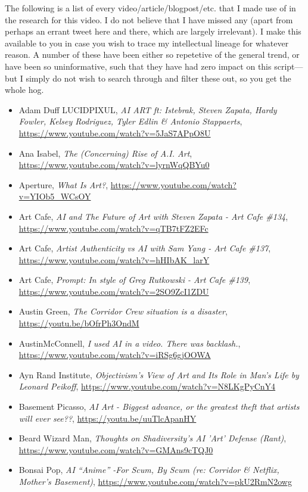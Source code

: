 \documentclass[11pt]{article}
\begin{document}
The following is a list of every video/article/blogpost/etc. that I made use of in the research for this video. I do not believe that I have missed any (apart from perhaps an errant tweet here and there, which are largely irrelevant). I make this available to you in case you wish to trace my intellectual lineage for whatever reason. A number of these have been either so repetetive of the general trend, or have been so uninformative, such that they have had zero impact on this script---but I simply do not wish to search through and filter these out, so you get the whole hog.

\begin{itemize}
\item Adam Duff LUCIDPIXUL, \emph{AI ART ft: Istebrak, Steven Zapata, Hardy Fowler, Kelsey Rodriguez, Tyler Edlin \& Antonio Stappaerts}, \url{https://www.youtube.com/watch?v=5JaS7APpO8U}
\item Ana Isabel, \emph{The (Concerning) Rise of A.I. Art}, \url{https://www.youtube.com/watch?v=lyrnWqQBYu0}
\item Aperture, \emph{What Is Art?}, \url{https://www.youtube.com/watch?v=YIOb5\_WCsOY}
\item Art Cafe, \emph{AI and The Future of Art with Steven Zapata - Art Cafe \#134}, \url{https://www.youtube.com/watch?v=qTB7tFZ2EFc}
\item Art Cafe, \emph{Artist Authenticity vs AI with Sam Yang - Art Cafe \#137}, \url{https://www.youtube.com/watch?v=hHIbAK\_larY}
\item Art Cafe, \emph{Prompt: In style of Greg Rutkowski - Art Cafe \#139}, \url{https://www.youtube.com/watch?v=2SO9ZcI1ZDU}
\item Austin Green, \emph{The Corridor Crew situation is a disaster}, \url{https://youtu.be/bOfrPh3OndM}
\item AustinMcConnell, \emph{I used AI in a video. There was backlash.}, \url{https://www.youtube.com/watch?v=iRSg6gjOOWA}
\item Ayn Rand Institute, \emph{Objectivism’s View of Art and Its Role in Man’s Life by Leonard Peikoff}, \url{https://www.youtube.com/watch?v=N8LKgPyCnY4}
\item Basement Picasso, \emph{AI Art - Biggest advance, or the greatest theft that artists will ever see??}, \url{https://youtu.be/uuTlcApanHY}
\item Beard Wizard Man, \emph{Thoughts on Shadiversity's AI 'Art' Defense (Rant)}, \url{https://www.youtube.com/watch?v=GMAns9cTQJ0}
\item Bonsai Pop, \emph{AI ``Anime'' -For Scum, By Scum (re: Corridor \& Netflix, Mother's Basement)}, \url{https://www.youtube.com/watch?v=pkU2RmN2owg}

\end{itemize}
\end{document}
